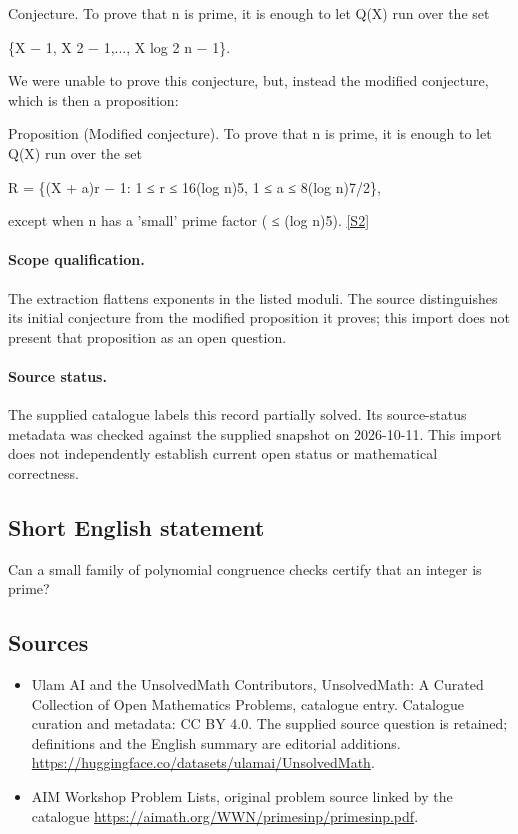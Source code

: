 \documentclass[11pt]{article}
\newcommand{\sref}[2]{\hyperlink{source:#1:#2}{[S#2]}}
\begin{document}
Conjecture. To prove that n is prime, it is enough to let Q(X) run over the set

\{X − 1, X 2 − 1,..., X log 2 n − 1\}.

We were unable to prove this conjecture, but, instead the modified conjecture, which is then a proposition:

Proposition (Modified conjecture). To prove that n is prime, it is enough to let Q(X) run over the set

R = \{(X + a)r − 1: 1 ≤ r ≤ 16(log n)5, 1 ≤ a ≤ 8(log n)7/2\},

except when n has a 'small' prime factor ( ≤ (log n)5). \sref{statement}{2}
\paragraph{Scope qualification.}
The extraction flattens exponents in the listed moduli. The source distinguishes its initial conjecture from the modified proposition it proves; this import does not present that proposition as an open question.
\paragraph{Source status.}
The supplied catalogue labels this record partially solved. Its source-status metadata was checked against the supplied snapshot on 2026-10-11. This import does not independently establish current open status or mathematical correctness.
\subsection{Short English statement}
Can a small family of polynomial congruence checks certify that an integer is prime?
\subsection{Sources}
\begin{itemize}
\item[\hypertarget{source:statement:1}{S1}] Ulam AI and the UnsolvedMath Contributors, UnsolvedMath: A Curated Collection of Open Mathematics Problems, catalogue entry. Catalogue curation and metadata: CC BY 4.0. The supplied source question is retained; definitions and the English summary are editorial additions.
\url{https://huggingface.co/datasets/ulamai/UnsolvedMath}.
\item[\hypertarget{source:statement:2}{S2}] AIM Workshop Problem Lists, original problem source linked by the catalogue
\url{https://aimath.org/WWN/primesinp/primesinp.pdf}.
\end{itemize}
\end{document}
